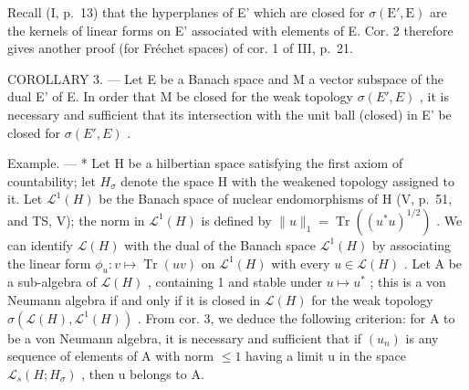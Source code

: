 Recall (I, p.~13) that the hyperplanes of E' which are closed for \(\sigma(\mathrm{E}', \mathrm{E})\) are the kernels of linear forms on E' associated with elements of E. Cor. 2 therefore gives another proof (for Fréchet spaces) of cor. 1 of III, p.~21.

COROLLARY 3. --- Let E be a Banach space and M a vector subspace of the dual E' of E. In order that M be closed for the weak topology \(\sigma(E', E)\) , it is necessary and sufficient that its intersection with the unit ball (closed) in E' be closed for \(\sigma(E', E)\) .

Example. --- * Let H be a hilbertian space satisfying the first axiom of countability; let \(H_{\sigma}\) denote the space H with the weakened topology assigned to it. Let \(\mathcal{L}^{1}(H)\) be the Banach space of nuclear endomorphisms of H (V, p.~51, and TS, V); the norm in \(\mathcal{L}^{1}(H)\) is defined by \(\|u\|_{1} = \operatorname{Tr}((u^{*}u)^{1/2})\) . We can identify \(\mathcal{L}(H)\) with the dual of the Banach space \(\mathcal{L}^{1}(H)\) by associating the linear form \(\phi_{u}: v \mapsto \operatorname{Tr}(uv)\) on \(\mathcal{L}^{1}(H)\) with every \(u \in \mathcal{L}(H)\) . Let A be a sub-algebra of \(\mathcal{L}(H)\) , containing 1 and stable under \(u \mapsto u^{*}\) ; this is a von Neumann algebra if and only if it is closed in \(\mathcal{L}(H)\) for the weak topology \(\sigma(\mathcal{L}(H), \mathcal{L}^{1}(H))\) . From cor. 3, we deduce the following criterion: for A to be a von Neumann algebra, it is necessary and sufficient that if \((u_{n})\) is any sequence of elements of A with norm \(\leqslant 1\) having a limit u in the space \(\mathcal{L}_{s}(H; H_{\sigma})\) , then u belongs to A.

